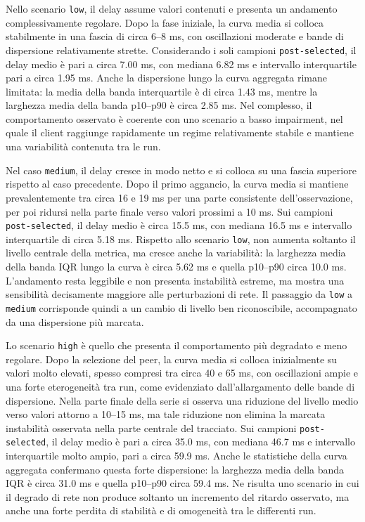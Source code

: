 Nello scenario \texttt{low}, il delay assume valori contenuti e presenta un andamento
complessivamente regolare. Dopo la fase iniziale, la curva media si colloca stabilmente
in una fascia di circa 6–8 ms, con oscillazioni moderate e bande di dispersione
relativamente strette. Considerando i soli campioni \texttt{post-selected}, il delay
medio è pari a circa 7.00 ms, con mediana 6.82 ms e intervallo interquartile
pari a circa 1.95 ms. Anche la dispersione lungo la curva aggregata rimane limitata:
la media della banda interquartile è di circa 1.43 ms, mentre la larghezza media della
banda p10–p90 è circa 2.85 ms. Nel complesso, il comportamento osservato è coerente
con uno scenario a basso impairment, nel quale il client raggiunge rapidamente
un regime relativamente stabile e mantiene una variabilità contenuta tra le run.

Nel caso \texttt{medium}, il delay cresce in modo netto e si colloca su una
fascia superiore rispetto al caso precedente. Dopo il primo aggancio, la curva
media si mantiene prevalentemente tra circa 16 e 19 ms per una parte consistente
dell’osservazione, per poi ridursi nella parte finale verso valori prossimi a 10 ms.
Sui campioni \texttt{post-selected}, il delay medio è circa 15.5 ms, con mediana 16.5
ms e intervallo interquartile di circa 5.18 ms. Rispetto allo scenario \texttt{low},
non aumenta soltanto il livello centrale della metrica, ma cresce anche la variabilità:
la larghezza media della banda IQR lungo la curva è circa 5.62 ms e quella
p10–p90 circa 10.0 ms. L’andamento resta leggibile e non presenta instabilità estreme,
ma mostra una sensibilità decisamente maggiore alle perturbazioni di rete. Il passaggio
da \texttt{low} a \texttt{medium} corrisponde quindi a un cambio di livello ben riconoscibile,
accompagnato da una dispersione più marcata.

Lo scenario \texttt{high} è quello che presenta il comportamento più degradato e meno
regolare. Dopo la selezione del peer, la curva media si colloca inizialmente su valori
molto elevati, spesso compresi tra circa 40 e 65 ms, con oscillazioni ampie e una
forte eterogeneità tra run, come evidenziato dall’allargamento delle bande di
dispersione. Nella parte finale della serie si osserva una riduzione del livello medio
verso valori attorno a 10–15 ms, ma tale riduzione non elimina la marcata
instabilità osservata nella parte centrale del tracciato. Sui campioni \texttt{post-selected},
il delay medio è pari a circa 35.0 ms, con mediana 46.7 ms e intervallo
interquartile molto ampio, pari a circa 59.9 ms. Anche le statistiche della
curva aggregata confermano questa forte dispersione: la larghezza media della banda
IQR è circa 31.0 ms e quella p10–p90 circa 59.4 ms. Ne risulta uno scenario in
cui il degrado di rete non produce soltanto un incremento del ritardo osservato, ma
anche una forte perdita di stabilità e di omogeneità tra le differenti run.

